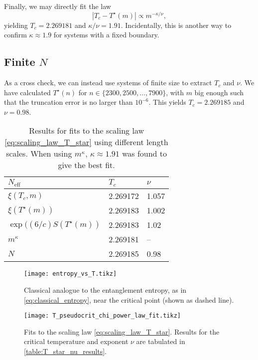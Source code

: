 Finally, we may directly fit the law
\begin{equation}
  |T_c - T^{\star}(m)| \propto m^{-\kappa/\nu},
\end{equation}
yielding $T_c = 2.269181$ and $\kappa/\nu = 1.91$.
Incidentally, this is another way to confirm $\kappa \approx 1.9$ for systems with a fixed boundary.

\subsection{Finite $N$}

As a cross check, we can instead use systems of finite size to extract $T_c$ and $\nu$.
We have calculated $T^{\star}(n)$ for $n \in \{ 2300, 2500, \dots, 7900 \}$,
with $m$ big enough such that the truncation error is no larger than $10^{-6}$.
This yields $T_c = 2.269185$ and $\nu = 0.98$.

\begin{table}[]
\centering
\begin{tabular}{@{}lll@{}} \toprule
$N_{\text{eff}}$                  & $T_c$   & $\nu$   \\ \midrule
$\xi(T_c, m)$                     & 2.269172  & 1.057         \\
$\xi(T^{\star}(m))$               & 2.269183   & 1.002        \\
$\exp((6/c)S(T^{\star}(m))$       & 2.269183   & 1.02       \\
$m^{\kappa}$                      & 2.269181  & --        \\
$N$                               & 2.269185  & 0.98          \\ \bottomrule
\end{tabular}
  \caption{Results for fits to the scaling law \autoref{eq:scaling_law_T_star} using different length scales.
  When using $m^{\kappa}$, $\kappa \approx 1.91$ was found to give the best fit.} \label{table:T_star_nu_results}
\end{table}

\begin{figure}
  \texttt{[image: entropy\_vs\_T.tikz]}
  \caption{Classical analogue to the entanglement entropy, as in \autoref{eq:classical_entropy},
  near the critical point (shown as dashed line).}\label{fig:entropy_vs_T}
\end{figure}

\begin{figure}
  \texttt{[image: T\_pseudocrit\_chi\_power\_law\_fit.tikz]}
  \caption{Fits to the scaling law \autoref{eq:scaling_law_T_star}.
  Results for the critical temperature and exponent $\nu$ are tabulated in
  \autoref{table:T_star_nu_results}.}\label{fig:T_pseudocrit_chi_power_law_fit}
\end{figure}

